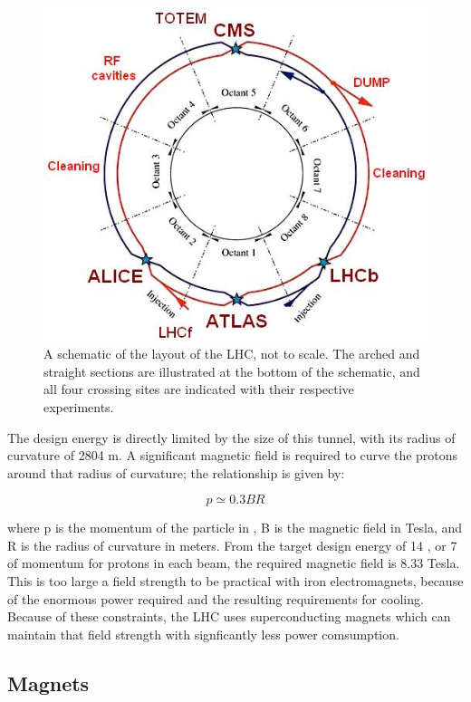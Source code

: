 \begin{figure}
\includegraphics[width=\fullfig]{figures/lhc_schematic.jpg}
\caption{A schematic of the layout of the \ac{LHC}, not to scale. The arched and straight sections are illustrated at the bottom of the schematic, and all four crossing sites are indicated with their respective experiments.}
\label{fig:lhc_schematic}
\end{figure}

The design energy is directly limited by the size of this tunnel, with its radius of curvature of 2804 m. 
A significant magnetic field is required to curve the protons around that radius of curvature; the relationship is given by:

\[ p \simeq 0.3BR\]

\noindent where p is the momentum of the particle in \GeV, B is the magnetic field in Tesla, and R is the radius of curvature in meters. 
From the target design energy of 14 \TeV, or 7 \TeV of momentum for protons in each beam, the required magnetic field is 8.33 Tesla.
This is too large a field strength to be practical with iron electromagnets, because of the enormous power required and the resulting requirements for cooling.
Because of these constraints, the \ac{LHC} uses superconducting magnets which can maintain that field strength with signficantly less power comsumption.

\subsection{Magnets}

